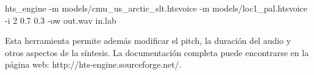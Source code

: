 \begin{tcolorbox}
hts\_engine -m models/cmu\_us\_arctic\_slt.htsvoice -m models/loc1\_pal.htsvoice -i 2 0.7 0.3 -ow out.wav in.lab
\end{tcolorbox}

Esta herramienta permite además modificar el pitch, la duración del audio y otros aspectos de la síntesis. La documentación completa puede encontrarse en la página web: http://hts-engine.sourceforge.net/.